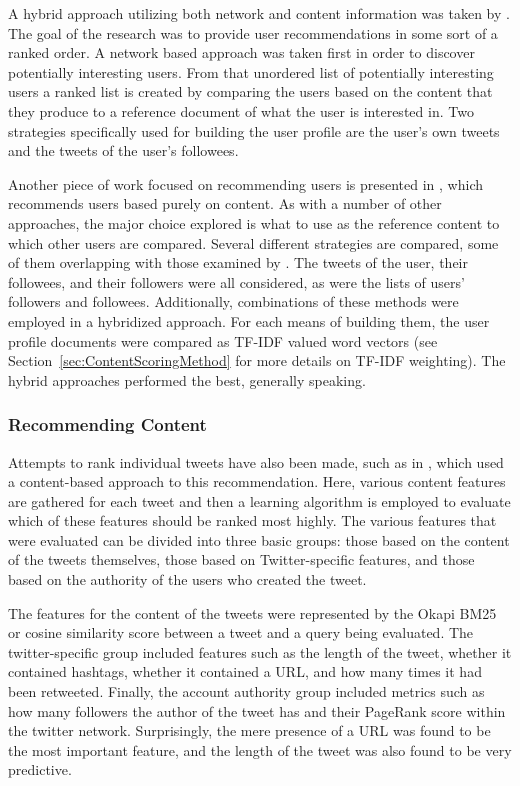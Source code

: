 A hybrid approach utilizing both network and content information was taken by \cite{Armentano2011}. The goal of the research was to provide user recommendations in some sort of a ranked order. A network based approach was taken first in order to  discover potentially interesting users. From that unordered list of potentially interesting users a ranked list is created by comparing the users based on the content that they produce to a reference document of what the user is interested in. Two strategies specifically used for building the user profile are the user's own tweets and the tweets of the user's followees.

Another piece of work focused on recommending users is presented in \cite{Hannon2010}, which recommends users based purely on content. As with a number of other approaches, the major choice explored is what to use as the reference content to which other users are compared. Several different strategies are compared, some of them overlapping with those examined by \cite{Armentano2011}. The tweets of the user, their followees, and their followers were all considered, as were the lists of users' followers and followees. Additionally, combinations of these methods were employed in a hybridized approach. For each means of building them, the user profile documents were compared as TF-IDF valued word vectors (see Section~\ref{sec:ContentScoringMethod} for more details on TF-IDF weighting). The hybrid approaches performed the best, generally speaking. 

\subsubsection{Recommending Content}

Attempts to rank individual tweets have also been made, such as in \cite{Duan2010}, which used a content-based approach to this recommendation. Here, various content features are gathered for each tweet and then a learning algorithm is employed to evaluate which of these features should be ranked most highly. The various features that were evaluated can be divided into three basic groups: those based on the content of the tweets themselves, those based on Twitter-specific features, and those based on the authority of the users who created the tweet.

The features for the content of the tweets were represented by the Okapi BM25 or cosine similarity score between a tweet and a query being evaluated. The twitter-specific group included features such as the length of the tweet, whether it contained hashtags, whether it contained a URL, and how many times it had been retweeted. Finally, the account authority group included metrics such as how many followers the author of the tweet has and their PageRank score within the twitter network. Surprisingly, the mere presence of a URL was found to be the most important feature, and the length of the tweet was also found to be very predictive.

